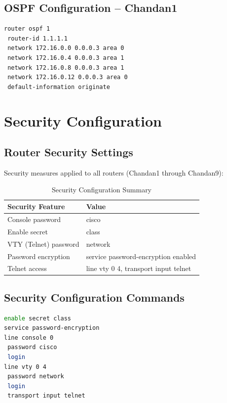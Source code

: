 \documentclass[12pt,a4paper]{report}
\begin{document}
\section{OSPF Configuration -- Chandan1}
\begin{lstlisting}[caption={Chandan1 OSPF Configuration},language=bash]
router ospf 1
 router-id 1.1.1.1
 network 172.16.0.0 0.0.0.3 area 0
 network 172.16.0.4 0.0.0.3 area 1
 network 172.16.0.8 0.0.0.3 area 1
 network 172.16.0.12 0.0.0.3 area 0
 default-information originate
\end{lstlisting}

\chapter{Security Configuration}

\section{Router Security Settings}
Security measures applied to all routers (Chandan1 through Chandan9):

\begin{table}[H]
\centering
\caption{Security Configuration Summary}
\begin{tabular}{ll}
\toprule
\textbf{Security Feature} & \textbf{Value} \\
\midrule
Console password & cisco \\
Enable secret & class \\
VTY (Telnet) password & network \\
Password encryption & service password-encryption enabled \\
Telnet access & line vty 0 4, transport input telnet \\
\bottomrule
\end{tabular}
\end{table}

\section{Security Configuration Commands}
\begin{lstlisting}[caption={Security Configuration for All Routers},language=bash]
enable secret class
service password-encryption
line console 0
 password cisco
 login
line vty 0 4
 password network
 login
 transport input telnet
\end{lstlisting}
\end{document}

